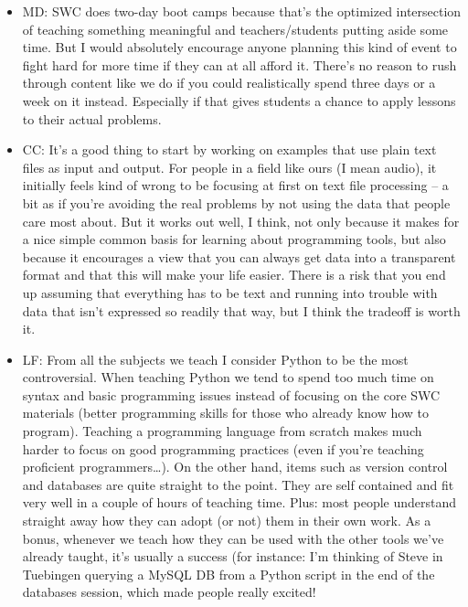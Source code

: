 \documentclass{article}
\begin{document}
\begin{itemize}
  \item MD: SWC does two-day boot camps because that's the optimized
    intersection of teaching something meaningful and
    teachers/students putting aside some time. But I would absolutely
    encourage anyone planning this kind of event to fight hard for
    more time if they can at all afford it. There's no reason to rush
    through content like we do if you could realistically spend three
    days or a week on it instead. Especially if that gives students a
    chance to apply lessons to their actual problems.

  \item CC: It's a good thing to start by working on examples that use
    plain text files as input and output.  For people in a field like
    ours (I mean audio), it initially feels kind of wrong to be
    focusing at first on text file processing -- a bit as if you're
    avoiding the real problems by not using the data that people care
    most about. But it works out well, I think, not only because it
    makes for a nice simple common basis for learning about
    programming tools, but also because it encourages a view that you
    can always get data into a transparent format and that this will
    make your life easier.  There is a risk that you end up assuming
    that everything has to be text and running into trouble with data
    that isn't expressed so readily that way, but I think the tradeoff
    is worth it.

  \item LF: From all the subjects we teach I consider Python to be the
    most controversial. When teaching Python we tend to spend too much
    time on syntax and basic programming issues instead of focusing on
    the core SWC materials (better programming skills for those who
    already know how to program). Teaching a programming language from
    scratch makes much harder to focus on good programming practices
    (even if you're teaching proficient programmers{\ldots}).  On the
    other hand, items such as version control and databases are quite
    straight to the point. They are self contained and fit very well
    in a couple of hours of teaching time. Plus: most people
    understand straight away how they can adopt (or not) them in their
    own work. As a bonus, whenever we teach how they can be used with
    the other tools we've already taught, it's usually a success (for
    instance: I'm thinking of Steve in Tuebingen querying a MySQL DB
    from a Python script in the end of the databases session, which
    made people really excited!


\end{itemize}
\end{document}
